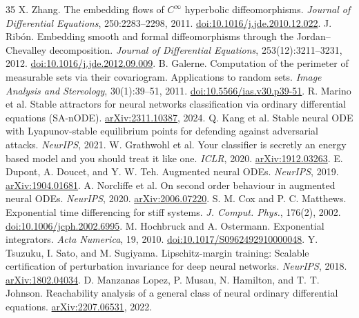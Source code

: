 \documentclass[10pt]{article}
\begin{document}
\begin{thebibliography}{35}
 X. Zhang. The embedding flows of $C^\infty$ hyperbolic diffeomorphisms. \emph{Journal of Differential Equations}, 250:2283--2298, 2011. \href{https://doi.org/10.1016/j.jde.2010.12.022}{doi:10.1016/j.jde.2010.12.022}.
 J. Rib\'on. Embedding smooth and formal diffeomorphisms through the Jordan--Chevalley decomposition. \emph{Journal of Differential Equations}, 253(12):3211--3231, 2012. \href{https://doi.org/10.1016/j.jde.2012.09.009}{doi:10.1016/j.jde.2012.09.009}.
 B. Galerne. Computation of the perimeter of measurable sets via their covariogram. Applications to random sets. \emph{Image Analysis and Stereology}, 30(1):39--51, 2011. \href{https://doi.org/10.5566/ias.v30.p39-51}{doi:10.5566/ias.v30.p39-51}.
 R. Marino et al. Stable attractors for neural networks classification via ordinary differential equations (SA-nODE). \href{https://arxiv.org/abs/2311.10387}{arXiv:2311.10387}, 2024.
 Q. Kang et al. Stable neural ODE with Lyapunov-stable equilibrium points for defending against adversarial attacks. \emph{NeurIPS}, 2021.
 W. Grathwohl et al. Your classifier is secretly an energy based model and you should treat it like one. \emph{ICLR}, 2020. \href{https://arxiv.org/abs/1912.03263}{arXiv:1912.03263}.
\ifdefined\ArticleOnly\else
{} E. Dupont, A. Doucet, and Y. W. Teh. Augmented neural ODEs. \emph{NeurIPS}, 2019. \href{https://arxiv.org/abs/1904.01681}{arXiv:1904.01681}.
\fi
\ifdefined\ArticleOnly\else
{} A. Norcliffe et al. On second order behaviour in augmented neural ODEs. \emph{NeurIPS}, 2020. \href{https://arxiv.org/abs/2006.07220}{arXiv:2006.07220}.
\fi
{} S. M. Cox and P. C. Matthews. Exponential time differencing for stiff systems. \emph{J. Comput. Phys.}, 176(2), 2002. \href{https://doi.org/10.1006/jcph.2002.6995}{doi:10.1006/jcph.2002.6995}.
 M. Hochbruck and A. Ostermann. Exponential integrators. \emph{Acta Numerica}, 19, 2010. \href{https://doi.org/10.1017/S0962492910000048}{doi:10.1017/S0962492910000048}.
\ifdefined\ArticleOnly\else
{} Y. Tsuzuku, I. Sato, and M. Sugiyama. Lipschitz-margin training: Scalable certification of perturbation invariance for deep neural networks. \emph{NeurIPS}, 2018. \href{https://arxiv.org/abs/1802.04034}{arXiv:1802.04034}.
\fi
{} D. Manzanas Lopez, P. Musau, N. Hamilton, and T. T. Johnson. Reachability analysis of a general class of neural ordinary differential equations. \href{https://arxiv.org/abs/2207.06531}{arXiv:2207.06531}, 2022.

\end{thebibliography}
\end{document}
